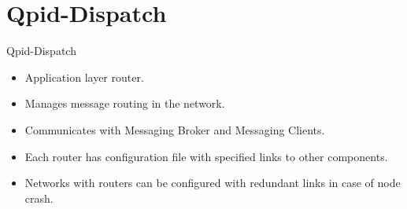 \documentclass[hyperref={pdfpagelabels=false, unicode},pdf,slideColor,fyma,9pt]{beamer}
\begin{document}
		\section{Qpid-Dispatch}
		\begin{frame}{Qpid-Dispatch}
				\begin{itemize}
						\setlength\itemsep{0.5em}
						\item Application layer router. 
						\item Manages message routing in the network.
						\item Communicates with Messaging Broker and Messaging Clients.		
						\item Each router has configuration file with specified links to other components.
						\item Networks with routers can be configured with redundant links in case of node crash.
				\end{itemize}	
			\begin{figure}[ht]
				\begin{center}
				\end{center}
			\end{figure}									
		\end{frame}
\end{document}
